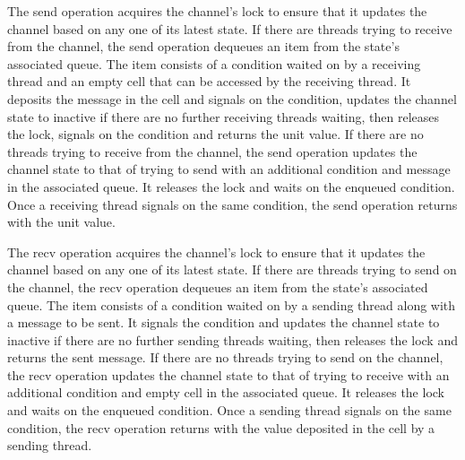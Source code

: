 \documentclass{article}
\begin{document}
The send operation acquires the channel's lock to ensure that it updates the channel based on
any one of its latest state.  If there are threads trying to receive from the channel, the send
operation dequeues an item from the state's associated queue.  The item consists of a condition
waited on by a receiving thread and an empty cell that can be accessed by the receiving thread.
It deposits the message in the cell and signals on the condition, updates the channel state to
inactive if there are no further receiving threads waiting, then releases the lock, signals on
the condition and returns the unit value.  If there are no threads trying to receive from the
channel, the send operation updates the channel state to that of trying to send with an
additional condition and message in the associated queue.  It releases the lock and waits on
the enqueued condition.  Once a receiving thread signals on the same condition, the send
operation returns with the unit value.

The recv operation acquires the channel's lock to ensure that it updates the channel based on
any one of its latest state.  If there are threads trying to send on the channel, the recv
operation dequeues an item from the state's associated queue.  The item consists of a condition
waited on by a sending thread along with a message to be sent.  It signals the condition and
updates the channel state to inactive if there are no further sending threads waiting, then
releases the lock and returns the sent message.  If there are no threads trying to send on the
channel, the recv operation updates the channel state to that of trying to receive with an
additional condition and empty cell in the associated queue.  It releases the lock and waits on
the enqueued condition.  Once a sending thread signals on the same condition, the recv
operation returns with the value deposited in the cell by a sending thread.
\end{document}
